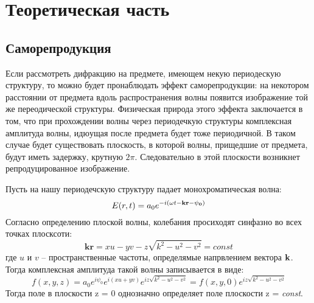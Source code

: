 \documentclass{urticle}
\begin{document}
\newpage

\section{Теоретическая часть}
\subsection{Саморепродукция}

    Если рассмотреть дифракцию на предмете, имеющем некую периодескую структуру, то можно будет пронаблюдать эффект саморепродукции: на некотором расстоянии от предмета вдоль распространения волны появится изображение той же переодической структуры. Физическая природа этого эффекта заключается в том, что при прохождении волны через периодечкую структуры комплексная амплитуда волны, идюущая после предмета будет тоже периодичной. В таком случае будет существовать плоскость, в которой волны, прищедшие от предмета, будут иметь задержку, крутную $2\pi$. Следовательно в этой плоскости возникнет репродуцированное изображение. 

    Пусть на нашу периодечскую структуру падает монохроматическая волна:
    \begin{equation}
        E(r,t) = a_0 e^{-i(\omega t- \bf{kr} - \psi_0)}
    \end{equation}
    Согласно определению плоской волны, колебания просиходят синфазно во всех точках плосксоти: 
    \begin{equation}
        \textbf{kr} = xu - yv - z\sqrt{k^2-u^2-v^2} = const
    \end{equation}
    где $u$ и $v$ -- пространственные частоты, определямые напрвлением вектора $\bf{k}$. Тогда комплексная амплитуда такой волны записывается в виде:
    \begin{equation}
        f(x,y,z) = a_0 e^{i\psi_0}e^{i(xu+yv)}e^{iz\sqrt{k^2-u^2-v^2}} = f(x,y,0)e^{iz\sqrt{k^2-u^2-v^2}}
    \end{equation}
    Тогда поле в плоскости z = 0 однозначно определяет поле плоскости z = \textit{const}. 
\end{document}
